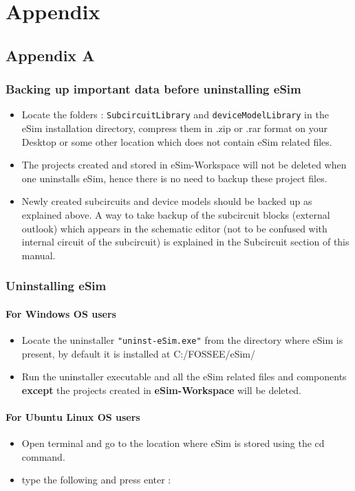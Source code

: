 \chapter{Appendix}
\section{Appendix A}
\subsection{Backing up important data before uninstalling eSim}
\begin{itemize}

\item Locate the folders : {\tt SubcircuitLibrary} and {\tt deviceModelLibrary} in the eSim installation directory, compress them in .zip or .rar format on your Desktop or some other location which does not contain eSim related files.
\item The projects created and stored in eSim-Workspace will not be deleted when one uninstalls eSim, hence there is no need to backup these project files. 
\item Newly created subcircuits and device models should be backed up as explained above. A way to take backup of the subcircuit blocks (external outlook) which appears in the schematic editor (not to be confused with internal circuit of the subcircuit) is explained in the Subcircuit section of this manual.
\end{itemize}
\subsection{Uninstalling eSim}

\subsubsection{For Windows OS users}
\begin{itemize}
\item Locate the uninstaller {\tt "uninst-eSim.exe"} from the directory where eSim is present, by default it is installed at C:/FOSSEE/eSim/ 
\item Run the uninstaller executable and all the eSim related files and components \textbf{except} the projects created in \textbf{eSim-Workspace} will be deleted.
\end{itemize}
\subsubsection{For Ubuntu Linux OS users}
\begin{itemize}
\item Open terminal and go to the location where eSim is stored using the cd command.
\item type the following and press enter : \\
\end{itemize}
